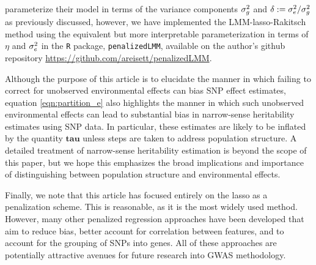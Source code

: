 \citet{Rakitsch2012} parameterize their model in terms of the variance components $\sigma^2_g$ and $\delta := \sigma^2_e / \sigma^2_g$ as previously discussed, however, we have implemented the LMM-lasso-Rakitsch method using the equivalent but more interpretable parameterization in terms of $\eta$ and $\sigma^2_e$ in the \texttt{R} package, \texttt{penalizedLMM}, available on the author's github repository \url{https://github.com/areisett/penalizedLMM}.

Although the purpose of this article is to elucidate the manner in which failing to correct for unobserved environmental effects can bias SNP effect estimates, equation \eqref{eqn:partition_e} also highlights the manner in which such unobserved environmental effects can lead to substantial bias in narrow-sense heritability estimates using SNP data. In particular, these estimates are likely to be inflated by the quantity $\boldsymbol{tau}$ unless steps are taken to address population structure. A detailed treatment of narrow-sense heritability estimation is beyond the scope of this paper, but we hope this emphasizes the broad implications and importance of distinguishing between population structure and environmental effects.

Finally, we note that this article has focused entirely on the lasso as a penalization scheme. This is reasonable, as it is the most widely used method. However, many other penalized regression approaches have been developed that aim to reduce bias, better account for correlation between features, and to account for the grouping of SNPs into genes. All of these approaches are potentially attractive avenues for future research into GWAS methodology.

